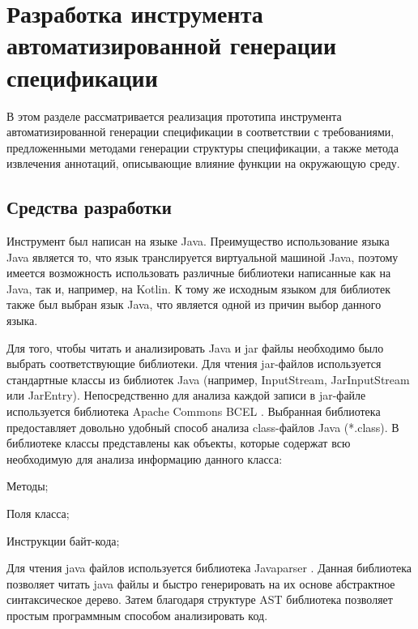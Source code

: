 \chapter{Разработка инструмента автоматизированной генерации спецификации}

В этом разделе рассматривается реализация прототипа инструмента автоматизированной генерации спецификации в соответствии с требованиями, предложенными методами генерации структуры спецификации, а также метода извлечения аннотаций, описывающие влияние функции на окружающую среду.

\section{Средства разработки}

Инструмент был написан на языке Java. Преимущество использование языка Java является то, что язык транслируется виртуальной машиной Java, поэтому имеется возможность использовать различные библиотеки написанные как на Java, так и, например, на Kotlin.
К тому же исходным языком для библиотек также был выбран язык Java, что является одной из причин выбор данного языка.

Для того, чтобы читать и анализировать Java и jar файлы необходимо было выбрать соответствующие библиотеки.
Для чтения jar-файлов используется стандартные классы из библиотек Java (например, InputStream, JarInputStream или JarEntry).
Непосредственно для анализа каждой записи в jar-файле используется библиотека Apache Commons BCEL \cite{bcel}. Выбранная библиотека предоставляет довольно удобный способ анализа class-файлов Java (*.class).
В библиотеке классы представлены как объекты, которые содержат всю необходимую для анализа информацию данного класса:
%
\begin{itemize*}
\item Методы;
\item Поля класса;
\item Инструкции байт-кода;
\end{itemize*}
%

Для чтения java файлов используется библиотека Javaparser \cite{javaparser}. Данная библиотека позволяет читать java файлы и быстро генерировать на их основе абстрактное синтаксическое дерево. Затем благодаря структуре AST библиотека позволяет простым программным способом анализировать код.

